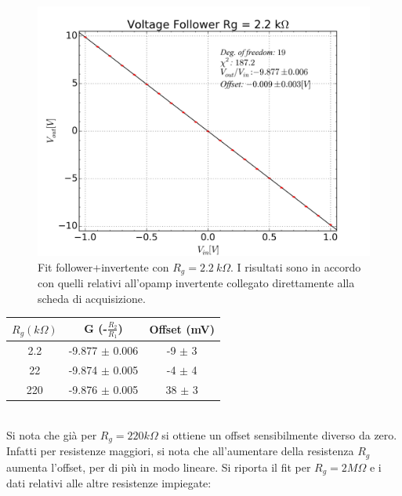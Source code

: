 \documentclass[journal, a4paper]{IEEEtran}
\begin{document}
\begin{figure}[htp]
\centering
\includegraphics[scale=.35]{fit_follower_1_21_2k_2k_22k}
\caption{Fit follower+invertente con $R_g = 2.2~k\Omega$. I risultati sono in accordo con quelli relativi all'opamp invertente collegato direttamente alla scheda di acquisizione.}
\end{figure}

\begin{center}
\begin{tabular}{|c|c|c|}
\hline 
$R_g (k\Omega)$ & G (-$\frac{R_2}{R_1}$) & Offset (mV) \\ 
\hline 
2.2 & -9.877 $\pm$ 0.006 & -9 $\pm$ 3 \\ 
\hline 
22 & -9.874 $\pm$ 0.005 & -4 $\pm$ 4 \\ 
\hline 
220 & -9.876 $\pm$ 0.005 & 38 $\pm$ 3 \\ 
\hline 
\end{tabular} 
\end{center}

~\\
Si nota che già per $R_g = 220 k\Omega$ si ottiene un offset sensibilmente diverso da zero. Infatti per resistenze maggiori, si nota che all'aumentare della resistenza $R_g$ aumenta l'offset, per di più in modo lineare. Si riporta il fit per $R_g = 2 M\Omega$ e i dati relativi alle altre resistenze impiegate:

\begin{figure}[htp]
\end{figure}
\end{document}
